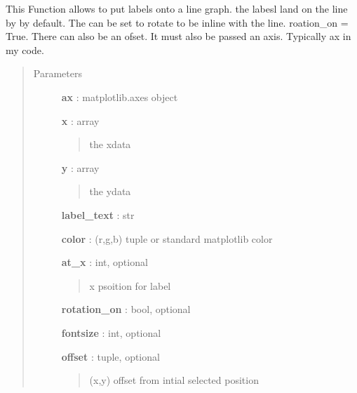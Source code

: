 \documentclass[letterpaper,10pt,english]{sphinxmanual}
\begin{document}

\begin{fulllineitems}
\label{pubplots:pubplots.plot.label_line}
This Function allows to put labels onto a line graph. the labesl land on the line by
by default. The can be set to rotate to be inline with the line. roation\_on = True. There
can also be an ofset. It must also be passed an axis. Typically ax in my code.
\begin{quote}\begin{description}
\item[{Parameters}] \leavevmode
\textbf{ax} : matplotlib.axes object

\textbf{x} : array
\begin{quote}

the xdata
\end{quote}

\textbf{y} : array
\begin{quote}

the ydata
\end{quote}

\textbf{label\_text} : str

\textbf{color} : (r,g,b) tuple or standard matplotlib color

\textbf{at\_x} : int, optional
\begin{quote}

x psoition for label
\end{quote}

\textbf{rotation\_on} : bool, optional

\textbf{fontsize} : int, optional

\textbf{offset} : tuple, optional
\begin{quote}

(x,y) offset from intial selected position
\end{quote}

\end{description}\end{quote}

\end{fulllineitems}

\end{document}
